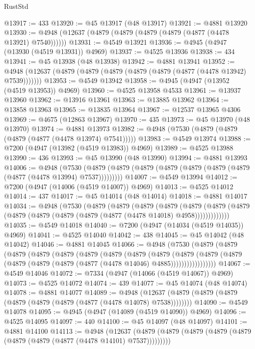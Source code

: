 \begin{lexlean}{RustStd}
\begin{coremodule}
@13917 := 433
@13920 := @45 @13917 (@48 @13917)
@13921 := @4881 @13920
@13930 := @4948 (@12637 (@4879 (@4879 (@4879 (@4879 (@4877 (@4478 @13921) @7540))))))
@13931 := @4549 @13921
@13936 := @4945 (@4947 (@13930 (@4519 @13931)) @4969)
@13937 := @4525 @13936
@13938 := 434
@13941 := @45 @13938 (@48 @13938)
@13942 := @4881 @13941
@13952 := @4948 (@12637 (@4879 (@4879 (@4879 (@4879 (@4879 (@4877 (@4478 @13942) @7539)))))))
@13953 := @4549 @13942
@13958 := @4945 (@4947 (@13952 (@4519 @13953)) @4969)
@13960 := @4525 @13958 @4533
@13961 := @13937 @13960
@13962 := @13916 @13961
@13963 := @13885 @13962
@13964 := @13858 @13963
@13965 := @13835 @13964
@13967 := @12537 @13965 @4306
@13969 := @4675 (@12863 @13967)
@13970 := 435
@13973 := @45 @13970 (@48 @13970)
@13974 := @4881 @13973
@13982 := @4948 (@7530 (@4879 (@4879 (@4879 (@4877 (@4478 @13974) @7541)))))
@13983 := @4549 @13974
@13988 := @7200 (@4947 (@13982 (@4519 @13983)) @4969)
@13989 := @4525 @13988
@13990 := 436
@13993 := @45 @13990 (@48 @13990)
@13994 := @4881 @13993
@14006 := @4948
    (@7530 (@4879 (@4879 (@4879 (@4879 (@4879 (@4879 (@4879 (@4877 (@4478 @13994) @7537)))))))))
@14007 := @4549 @13994
@14012 := @7200 (@4947 (@14006 (@4519 @14007)) @4969)
@14013 := @4525 @14012
@14014 := 437
@14017 := @45 @14014 (@48 @14014)
@14018 := @4881 @14017
@14034 := @4948
    (@7530
      (@4879
        (@4879
          (@4879
            (@4879
              (@4879
                (@4879 (@4879 (@4879 (@4879 (@4879 (@4879 (@4877 (@4478 @14018) @4958)))))))))))))
@14035 := @4549 @14018
@14040 := @7200 (@4947 (@14034 (@4519 @14035)) @4969)
@14041 := @4525 @14040
@14042 := 438
@14045 := @45 @14042 (@48 @14042)
@14046 := @4881 @14045
@14066 := @4948
    (@7530
      (@4879
        (@4879
          (@4879
            (@4879
              (@4879
                (@4879
                  (@4879
                    (@4879
                      (@4879
                        (@4879
                          (@4879
                            (@4879 (@4879 (@4879 (@4879 (@4877 (@4478 @14046) @4885)))))))))))))))))
@14067 := @4549 @14046
@14072 := @7334 (@4947 (@14066 (@4519 @14067)) @4969)
@14073 := @4525 @14072
@14074 := 439
@14077 := @45 @14074 (@48 @14074)
@14078 := @4881 @14077
@14089 := @4948
    (@12637 (@4879 (@4879 (@4879 (@4879 (@4879 (@4879 (@4877 (@4478 @14078) @7538))))))))
@14090 := @4549 @14078
@14095 := @4945 (@4947 (@14089 (@4519 @14090)) @4969)
@14096 := @4525 @14095
@14097 := 440
@14100 := @45 @14097 (@48 @14097)
@14101 := @4881 @14100
@14113 := @4948
    (@12637 (@4879 (@4879 (@4879 (@4879 (@4879 (@4879 (@4879 (@4877 (@4478 @14101) @7537)))))))))

\end{coremodule}
\end{lexlean}
